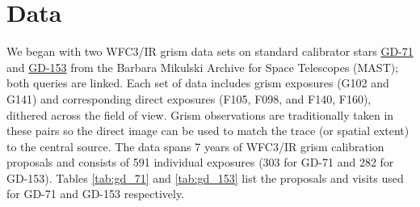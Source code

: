 \documentclass[12pt]{article}
\begin{document}

\section{Data}

    We began with two WFC3/IR grism data sets on standard calibrator stars
    \href{http://archive.stsci.edu/hst/search.php?action=Search&sci_instrume=WFC3&sci_targname=GD-71&sci_pep_id=11552,11926,11936,12333,12357,12702,13092,13579,14024,14386&sci_aper_1234=IR,G*}{
        \color{blue} GD-71} and
    \href{http://archive.stsci.edu/hst/search.php?action=Search&sci_instrume=WFC3&sci_targname=GD-153&sci_pep_id=11552,11926,11936,12333,12357,12702,13092,13579,14024,14386&sci_aper_1234=IR,G*}{
        \color{blue} GD-153} from the 
Barbara Mikulski Archive for Space Telescopes (MAST); both queries are linked. Each set of 
data includes grism exposures (G102 and G141) and corresponding direct exposures (F105, F098, and F140, F160), 
dithered across the field of view. Grism observations are traditionally taken
in these pairs so the direct image can be used to match the trace (or spatial
extent) to the central source. The data spans 7 years of WFC3/IR grism calibration proposals and consists of 
591 individual exposures (303 for GD-71 and 282 for GD-153). Tables \ref{tab:gd_71} and \ref{tab:gd_153} list the proposals and visits
used for GD-71 and GD-153 respectively. 
\end{document}
